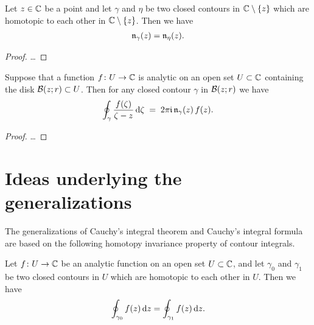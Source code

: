 \begin{lemma}
  \label{lem:winding_homotopy_invariance}
  Let $z \in \bC$ be a point and let $\gamma$ and $\eta$ be two
  closed contours in $\bC \setminus \set{z}$ which are homotopic
  to each other in $\bC \setminus \set{z}$. Then we have
  \begin{align*}
    \windN{\gamma}{z} = \windN{\eta}{z} .
  \end{align*}
\end{lemma}
\begin{proof}
  \ldots
\end{proof}

\begin{theorem}
  \label{thm:CAUCHY_FORMULA}
  Suppose that a function $f \colon U \to \bC$ is analytic on an open
  set $U \subset \bC$ containing the disk $\DiskRC{r}{z} \subset U$.
  Then for any closed contour $\gamma$ in $\DiskRC{r}{z}$ we have
  \begin{align*}
    \oint_\gamma \frac{f(\zeta)}{\zeta - z} \, \ud \zeta
    \; = \; 2\pi \ii \, \windN{\gamma}{z} \, f(z) .
  \end{align*}
\end{theorem}
\begin{proof}
  \ldots
\end{proof}



\section{Ideas underlying the generalizations}

The generalizations of Cauchy's integral theorem and Cauchy's integral
formula are based on the following homotopy invariance property of
contour integrals.

\begin{lemma}
  \label{lem:homotopy_invariance}
  Let $f \colon U \to \bC$ be an analytic function on an open
  set $U \subset \bC$, and let $\gamma_0$ and $\gamma_1$ be two
  closed contours in $U$ which are homotopic to each other in $U$.
  Then we have
  \begin{align*}
    \oint_{\gamma_0} f(z) \, \ud z = \oint_{\gamma_1} f(z) \, \ud z .
  \end{align*}
\end{lemma}
